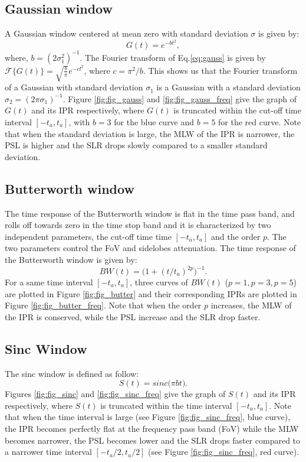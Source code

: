 \documentclass[useAMS,usenatbib]{mn2e}
\begin{document}
\subsection{Gaussian window}
A Gaussian window centered at mean zero with standard deviation $\sigma$ is given by: 
\begin{equation}
  G(t)= e^{-bt^{2}}, \label{eq:gauss}
\end{equation}
where, $b=(2\sigma_1^2)^{-1}$. The  Fourier transform of Eq.\ref{eq:gauss} is given by 
$\mathcal{F}\big\{G(t)\big\}=\sqrt{\frac{b}{\pi}}e^{-cl^2}$, where $c=\pi^2/b$.
This shows us that the Fourier transform of a Gaussian with standard deviation $\sigma_1$ is a Gaussian with a standard 
deviation $\sigma_2= (2\pi\sigma_1)^{-1}$.
Figure \ref{fig:fig_gauss} and \ref{fig:fig_gauss_freq} give the graph of $G(t)$ and its IPR respectively, where $G(t)$ 
is truncated within the cut-off time interval $[-t_a,t_a]$, with $b = 3$ for the blue curve and $b=5$ for the red curve. Note 
that when the standard deviation is large, the MLW of the IPR is narrower, the PSL is higher and the SLR drops slowly compared to a 
smaller standard deviation.
\subsection{Butterworth window}
The time response of the Butterworth window is flat  in the time pass band, and rolls off towards zero in the time stop band and it is 
characterized by two independent parameters, the cut-off time time $[-t_a,t_a]$ and the order $p$. The two parameters control the 
FoV and sidelobes  attenuation. The time response of the Butterworth window is given by:
\begin{equation}
BW(t)= \Big(1 + (t/t_a)^{2p}\Big)^{-1}.
\end{equation}
For a same time interval $[-t_a,t_a]$, three curves of $BW(t)$ ($p=1, p=3, p=5$) are plotted  in Figure \ref{fig:fig_butter} and 
their corresponding IPRs are plotted in Figure \ref{fig:fig_butter_freq}. Note that when the order $p$ increases, the MLW of the 
IPR is conserved, while the PSL increase and the SLR drop faster.
\subsection{Sinc Window}
The sinc window is defined as follow:
\begin{equation}
S(t)= sinc\big(\pi b t\big).
\end{equation}
 Figures \ref{fig:fig_sinc} and \ref{fig:fig_sinc_freq} give the graph of $S(t)$ and its IPR respectively, where 
$S(t)$ is truncated within the time interval $[-t_a,t_a]$. Note that when the time interval is large 
(see Figure \ref{fig:fig_sinc_freq}, blue curve), the IPR becomes perfectly flat at the frequency pass band (FoV) while the MLW becomes 
narrower,  the PSL 
becomes lower and the SLR drops faster compared to a narrower time interval $[-t_a/2,t_a/2]$ (see Figure \ref{fig:fig_sinc_freq}, red 
curve). 
\end{document}
